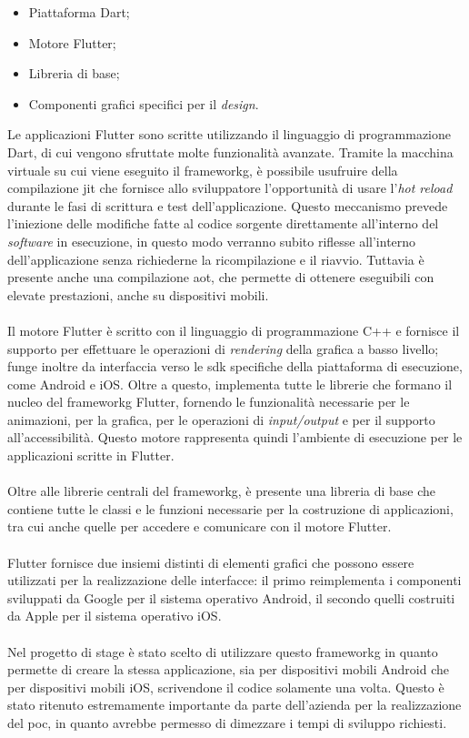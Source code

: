 \begin{itemize}
	\item Piattaforma Dart;
	\item Motore Flutter;
	\item Libreria di base;
	\item Componenti grafici specifici per il \textit{design}.
\end{itemize}
Le applicazioni Flutter sono scritte utilizzando il linguaggio di programmazione Dart, di cui vengono sfruttate molte funzionalità avanzate. Tramite la macchina virtuale su cui viene eseguito il \gls{frameworkg}, è possibile usufruire della compilazione \gls{jit}\glsfirstoccur{} che fornisce allo sviluppatore l'opportunità di usare l'\textit{hot reload} durante le fasi di scrittura e test dell'applicazione. Questo meccanismo prevede l'iniezione delle modifiche fatte al codice sorgente direttamente all'interno del \textit{software} in esecuzione, in questo modo verranno subito riflesse all'interno dell'applicazione senza richiederne la ricompilazione e il riavvio. Tuttavia è presente anche una compilazione \gls{aot}\glsfirstoccur{}, che permette di ottenere eseguibili con elevate prestazioni, anche su dispositivi mobili.
\\\\
Il motore Flutter è scritto con il linguaggio di programmazione C++ e fornisce il supporto per effettuare le operazioni di \textit{rendering} della grafica a basso livello; funge inoltre da interfaccia verso le \gls{sdk} specifiche della piattaforma di esecuzione, come Android e iOS. Oltre a questo, implementa tutte le librerie che formano il nucleo del \gls{frameworkg} Flutter, fornendo le funzionalità necessarie per le animazioni, per la grafica, per le operazioni di \textit{input/output} e per il supporto all'accessibilità. Questo motore rappresenta quindi l'ambiente di esecuzione per le applicazioni scritte in Flutter.
\\\\
Oltre alle librerie centrali del \gls{frameworkg}, è presente una libreria di base che contiene tutte le classi e le funzioni necessarie per la costruzione di applicazioni, tra cui anche quelle per accedere e comunicare con il motore Flutter.
\\\\
Flutter fornisce due insiemi distinti di elementi grafici che possono essere utilizzati per la realizzazione delle interfacce: il primo reimplementa i componenti sviluppati da Google per il sistema operativo Android, il secondo quelli costruiti da Apple per il sistema operativo iOS.
\\\\
Nel progetto di stage è stato scelto di utilizzare questo \gls{frameworkg} in quanto permette di creare la stessa applicazione, sia per dispositivi mobili Android che per dispositivi mobili iOS, scrivendone il codice solamente una volta. Questo è stato ritenuto estremamente importante da parte dell'azienda per la realizzazione del \gls{poc}, in quanto avrebbe permesso di dimezzare i tempi di sviluppo richiesti.

